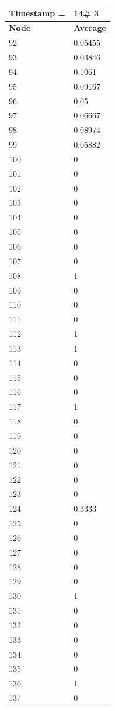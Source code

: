 \begin{tabular}{|l||l|}
\hline
\textbf{Timestamp =} & \textbf{14}\# 3\\\hline
	\textbf{Node} & \textbf{Average} \\ \hline
\hline
	92 & 0.05455 \\ \hline
	93 & 0.03846 \\ \hline
	94 & 0.1061 \\ \hline
	95 & 0.09167 \\ \hline
	96 & 0.05 \\ \hline
	97 & 0.06667 \\ \hline
	98 & 0.08974 \\ \hline
	99 & 0.05882 \\ \hline
	100 & 0 \\ \hline
	101 & 0 \\ \hline
	102 & 0 \\ \hline
	103 & 0 \\ \hline
	104 & 0 \\ \hline
	105 & 0 \\ \hline
	106 & 0 \\ \hline
	107 & 0 \\ \hline
	108 & 1 \\ \hline
	109 & 0 \\ \hline
	110 & 0 \\ \hline
	111 & 0 \\ \hline
	112 & 1 \\ \hline
	113 & 1 \\ \hline
	114 & 0 \\ \hline
	115 & 0 \\ \hline
	116 & 0 \\ \hline
	117 & 1 \\ \hline
	118 & 0 \\ \hline
	119 & 0 \\ \hline
	120 & 0 \\ \hline
	121 & 0 \\ \hline
	122 & 0 \\ \hline
	123 & 0 \\ \hline
	124 & 0.3333 \\ \hline
	125 & 0 \\ \hline
	126 & 0 \\ \hline
	127 & 0 \\ \hline
	128 & 0 \\ \hline
	129 & 0 \\ \hline
	130 & 1 \\ \hline
	131 & 0 \\ \hline
	132 & 0 \\ \hline
	133 & 0 \\ \hline
	134 & 0 \\ \hline
	135 & 0 \\ \hline
	136 & 1 \\ \hline
	137 & 0 \\ \hline
\end{tabular}

